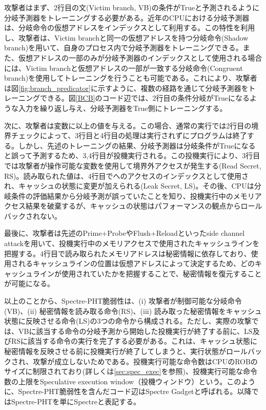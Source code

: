 攻撃者はまず、2行目の文(Victim branch, VB)の条件がTrueと予測されるように分岐予測器をトレーニングする必要がある。近年のCPUにおける分岐予測器は、分岐命令の仮想アドレスをインデックスとして利用する\cite{fog2016microarchitecture,8835233}。この特性を利用し、攻撃者は、Victim branchと同一の仮想アドレスを持つ分岐命令(Shadow branch)を用いて、自身のプロセス内で分岐予測器をトレーニングできる。また、仮想アドレスの一部のみが分岐予測器のインデックスとして使用される場合には、Victim branchと仮想アドレスの一部が一致する分岐命令(Congruent branch)を使用してトレーニングを行うことも可能である。これにより、攻撃者は図\ref{fig:branch_predicator}に示すように、複数の経路を通じて分岐予測器をトレーニングできる\cite{canella2019systematic}。図\ref{BCB}のコード辺では、2行目の条件分岐がTrueになるような入力を繰り返し与え、分岐予測器をTrue側にトレーニングする。\par

次に、攻撃者は変数に以上の値を与える。この場合、通常の実行では2行目の境界チェックによって、3行目と4行目の処理は実行されずにプログラムは終了する。しかし、先述のトレーニングの結果、分岐予測器は分岐条件がTrueになると誤って予測するため、3,4行目が投機実行される。この投機実行により、3行目では攻撃者が操作可能な変数を使用して境界外アクセスが発生する(Read Secret, RS)。読み取られた値は、4行目でへのアクセスのインデックスとして使用され、キャッシュの状態に変更が加えられる(Leak Secret, LS)。その後、CPUは分岐条件の評価結果から分岐予測が誤っていたことを知り、投機実行中のメモリアクセス結果を破棄するが、キャッシュの状態はパフォーマンスの観点からロールバックされない。\par

最後に、攻撃者は先述のPrime+ProbeやFlush+Reloadといったside channel attackを用いて、投機実行中のメモリアクセスで使用されたキャッシュラインを把握する。4行目で読み取られたメモリアドレスは秘密情報に依存しており、使用されるキャッシュラインの位置は仮想アドレスによって決定するため、どのキャッシュラインが使用されていたかを把握することで、秘密情報を復元することが可能になる。\par
以上のことから、Spectre-PHT脆弱性は、(i) 攻撃者が制御可能な分岐命令(VB)、(ii) 秘密情報を読み取る命令(RS)、(iii) 読み取った秘密情報をキャッシュ状態に反映させる命令(LS)の3つの命令から構成される。ただし、実際の攻撃では、VBに該当する命令の分岐予測から開始した投機実行が終了する前に、LS及びRSに該当する命令の実行を完了する必要がある。これは、キャッシュ状態に秘密情報を反映させる前に投機実行が終了してしまうと、実行状態がロールバックされ、攻撃が成立しないためである。投機実行可能な命令数はCPUのROBのサイズに制限されており(詳しくは\ref{sec:spec_exec}を参照)、投機実行可能な命令数の上限をSpeculative execution window（投機ウィンドウ）という。このように、Spectre-PHT脆弱性を含んだコード辺はSpectre Gadgetと呼ばれる。以降ではSpectre-PHTを単にSpectreと表記する。


